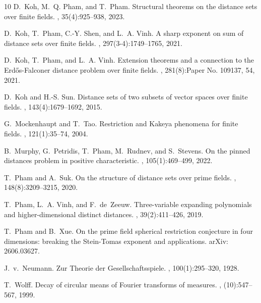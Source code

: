 \documentclass[11pt]{article}
\newcommand{\1}{\mathbf{1}}
\begin{document}
\begin{thebibliography}{10}
	D.~Koh, M.~Q. Pham, and T.~Pham.
	\newblock Structural theorems on the distance sets over finite fields.
	, 35(4):925--938, 2023.
	
	D.~Koh, T.~Pham, C.-Y. Shen, and L.~A. Vinh.
	\newblock A sharp exponent on sum of distance sets over finite fields.
	, 297(3-4):1749--1765, 2021.
	
	D.~Koh, T.~Pham, and L.~A. Vinh.
	\newblock Extension theorems and a connection to the {{E}rd\H{o}s-{F}alconer}
	distance problem over finite fields.
	, 281(8):Paper No. 109137, 54, 2021.
	
	D.~Koh and H.-S. Sun.
	\newblock Distance sets of two subsets of vector spaces over finite fields.
	, 143(4):1679--1692, 2015.
	
	G.~Mockenhaupt and T.~Tao.
	\newblock Restriction and {K}akeya phenomena for finite fields.
	, 121(1):35--74, 2004.
	
	B.~Murphy, G.~Petridis, T.~Pham, M.~Rudnev, and S.~Stevens.
	\newblock On the pinned distances problem in positive characteristic.
	, 105(1):469--499, 2022.
	
	T.~Pham and A.~Suk.
	\newblock On the structure of distance sets over prime fields.
	, 148(8):3209--3215, 2020.
	
	T.~Pham, L.~A. Vinh, and F.~de~Zeeuw.
	\newblock Three-variable expanding polynomials and higher-dimensional distinct
	distances.
	, 39(2):411--426, 2019.
	
	T.~Pham and B.~Xue.
	\newblock On the prime field spherical restriction conjecture in four
	dimensions: breaking the {Stein-Tomas} exponent and applications.
	\newblock arXiv: 2606.03627.
	
	J.~v.~Neumann.
	\newblock Zur {T}heorie der {G}esellschaftsspiele.
	, 100(1):295--320, 1928.
	
	T.~Wolff.
	\newblock Decay of circular means of {F}ourier transforms of measures.
	, (10):547--567, 1999.
	
\end{thebibliography}
\end{document}
